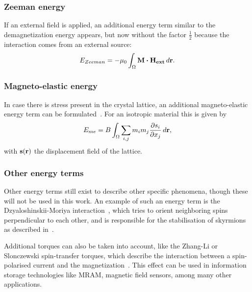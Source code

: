 \documentclass[12pt,a4paper]{article}
\begin{document}
\subsubsection{Zeeman energy}
If an external field is applied, an additional energy term similar to the demagnetization energy appears, but now without the factor $\frac{1}{2}$ because the interaction comes from an external source:
\begin{equation}
    E_{Zeeman} = -\mu_0 \int_\Omega \vb{M} \vdot \vb{H_{ext}} \, d\vb{r} \mathrm{.} \label{eq:Energy_Term_Zeeman}
\end{equation}

\subsubsection{Magneto-elastic energy}
\label{par:Energy_MagnetoElastic}
In case there is stress present in the crystal lattice, an additional magneto-elastic energy term can be formulated~\cite{Gilbert1956}. For an isotropic material this is given by
\begin{equation}
    E_{me} = B \int_\Omega \sum_{i,j} m_i m_j \frac{\partial s_i}{\partial x_j} \,d\vb{r} \mathrm{,}
\end{equation}
with $\vb{s}(\vb{r})$ the displacement field of the lattice.

\subsubsection{Other energy terms}
Other energy terms still exist to describe other specific phenomena, though these will not be used in this work. An example of such an energy term is the Dzyaloshinskii-Moriya interaction~\cite{DzyaloshinskiiMoriya}, which tries to orient neighboring spins perpendicular to each other, and is responsible for the stabilisation of skyrmions as described in~\cite{skyrmions}. \par Additional torques can also be taken into account, like the Zhang-Li or Slonczewski spin-transfer torques, which describe the interaction between a spin-polarised current and the magnetization~\cite{ZhangLiSpinTransferTorque, MuMax3, syllabus_PoAEaPD}. This effect can be used in information storage technologies like MRAM, magnetic field sensors, among many other applications.~\cite{syllabus_PoAEaPD}
\end{document}
